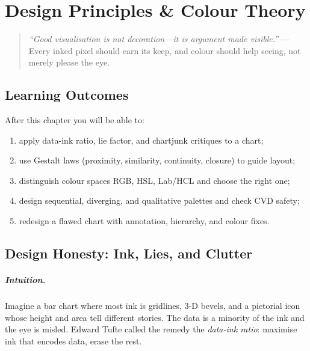 \chapter{Design Principles \& Colour Theory}
\label{ch:design-colour}
\sloppy

\begin{quote}
\emph{``Good visualisation is not decoration---it is argument made visible.''} --- Every inked pixel should earn its keep, and colour should help seeing, not merely please the eye.
\end{quote}

\noindent{}
\vspace{0.4em}

\section*{Learning Outcomes}
After this chapter you will be able to:
\begin{enumerate}[label=(L\arabic*)]
    \item apply data-ink ratio, lie factor, and chartjunk critiques to a chart;
    \item use Gestalt laws (proximity, similarity, continuity, closure) to guide layout;
    \item distinguish colour spaces RGB, HSL, Lab/HCL and choose the right one;
    \item design sequential, diverging, and qualitative palettes and check CVD safety;
    \item redesign a flawed chart with annotation, hierarchy, and colour fixes.
\end{enumerate}

\section{Design Honesty: Ink, Lies, and Clutter}
\label{sec:honesty}
\paragraph{Intuition.} Imagine a bar chart where most ink is gridlines, 3-D bevels, and a pictorial icon whose height and area tell different stories. The data is a minority of the ink and the eye is misled. Edward Tufte called the remedy the \emph{data-ink ratio}: maximise ink that encodes data, erase the rest.

